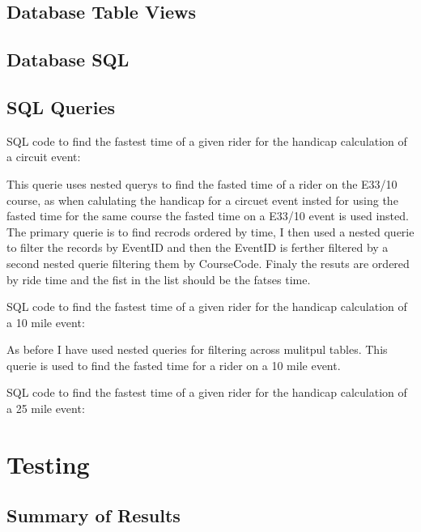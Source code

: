\subsection{Database Table Views}
\clearpage

\begin{landscape}
\subsection{Database SQL}
\end{landscape}
\subsection{SQL Queries}

SQL code to find the fastest time of a given rider for the handicap calculation of a circuit event:


This querie uses nested querys to find the fasted time of a rider on the E33/10 course, as when calulating the handicap for a circuet event insted for using the fasted time for the same course the fasted time on a E33/10 event is used insted. The primary querie is to find recrods ordered by time, I then used a nested querie to filter the records by EventID and then the EventID is ferther filtered by a second nested querie filtering them by CourseCode. Finaly the resuts are ordered by ride time and the fist in the list should be the fatses time.

SQL code to find the fastest time of a given rider for the handicap calculation of a 10 mile event:


As before I have used nested queries for filtering across mulitpul tables. This querie is used to find the fasted time for a rider on a 10 mile event. 

SQL code to find the fastest time of a given rider for the handicap calculation of a 25 mile event:


\section{Testing}

\subsection{Summary of Results}


